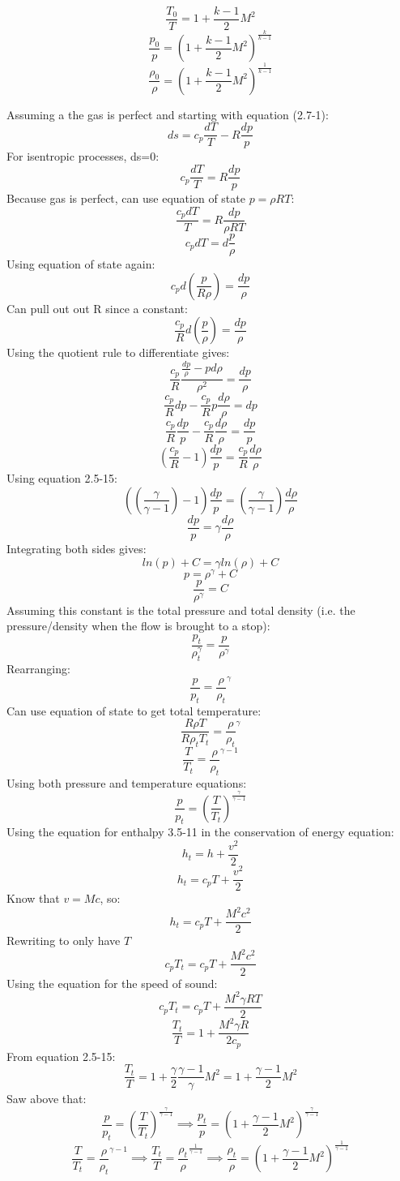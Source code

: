\documentclass[preview,12pt]{article}
\begin{document}
    $$\frac{T_0}{T}=1+\frac{k-1}{2}M^2$$
    $$\frac{p_0}{p}=\left(1+\frac{k-1}{2}M^2\right)^\frac{k}{k-1}$$
    $$\frac{\rho_0}{\rho}=\left(1+\frac{k-1}{2}M^2\right)^\frac{1}{k-1}$$
    
    Assuming a the gas is perfect and starting with equation (2.7-1):
    $$ds=c_p\frac{dT}{T}-R\frac{dp}{p}$$
    For isentropic processes, ds=0:
    $$c_p\frac{dT}{T}=R\frac{dp}{p}$$
    Because gas is perfect, can use equation of state $p=\rho R T$:
    $$\frac{c_pdT}{T}=R\frac{dp}{\rho R T}$$
    $$c_p dT=d\frac{p}{\rho}$$
    Using equation of state again:
    $$c_pd(\frac{p}{R\rho})=\frac{dp}{\rho}$$
    Can pull out out R since a constant:
    $$\frac{c_p}{R}d(\frac{p}{\rho})=\frac{dp}{\rho}$$
    Using the quotient rule to differentiate gives:
    $$\frac{c_p}{R}\frac{\frac{dp}{\rho}-pd\rho}{\rho^2}=\frac{dp}{\rho}$$
    $$\frac{c_p}{R}dp-\frac{c_p}{R}p\frac{d\rho}{\rho}=dp$$
    $$\frac{c_p}{R}\frac{dp}{p}-\frac{c_p}{R}\frac{d\rho}{\rho}=\frac{dp}{p}$$
    $$(\frac{c_p}{R}-1)\frac{dp}{p}=\frac{c_p}{R}\frac{d\rho}{\rho}$$
    Using equation 2.5-15:
    $$((\frac{\gamma}{\gamma-1})-1)\frac{dp}{p}=(\frac{\gamma}{\gamma-1})\frac{d\rho}{\rho}$$
    $$\frac{dp}{p}=\gamma\frac{d\rho}{\rho}$$
    Integrating both sides gives:
    $$ln(p)+C=\gamma ln(\rho)+C$$
    $$p=\rho^\gamma+C$$
    $$\frac{p}{\rho^\gamma}=C$$
    Assuming this constant is the total pressure and total density (i.e. the pressure/density when the flow is brought to a stop):
    $$\frac{p_t}{\rho_t^\gamma}=\frac{p}{\rho^\gamma}$$
    Rearranging:
    $$\frac{p}{p_t}=\frac{\rho}{\rho_t}^\gamma$$
    Can use equation of state to get total temperature:
    $$\frac{R\rho T}{R\rho_tT_t}=\frac{\rho}{\rho_t}^\gamma$$
    $$\frac{T}{T_t}=\frac{\rho}{\rho_t}^{\gamma-1}$$
    Using both pressure and temperature equations:
    $$\frac{p}{p_t}=\left(\frac{T}{T_t}\right)^{\frac{\gamma}{\gamma-1}}$$
    Using the equation for enthalpy 3.5-11 in the conservation of energy equation:
    $$h_t=h+\frac{v^2}{2}$$
    $$h_t=c_pT+\frac{v^2}{2}$$
    Know that $v=Mc$, so:
    $$h_t=c_pT+\frac{M^2c^2}{2}$$
    Rewriting to only have $T$
    $$c_pT_t=c_pT+\frac{M^2c^2}{2}$$
    Using the equation for the speed of sound:
    $$c_pT_t=c_pT+\frac{M^2\gamma RT}{2}$$
    $$\frac{T_t}{T}=1+\frac{M^2\gamma R}{2c_p}$$
    From equation 2.5-15:
    $$\frac{T_t}{T}=1+\frac{\gamma}{2}\frac{\gamma-1}{\gamma}M^2=\boxed{1+\frac{\gamma-1}{2}M^2}$$
    Saw above that:
    $$\frac{p}{p_t}=\left(\frac{T}{T_t}\right)^{\frac{\gamma}{\gamma-1}}\implies\frac{p_t}{p}=\boxed{\left(1+\frac{\gamma-1}{2}M^2\right)^\frac{\gamma}{\gamma-1}}$$
    $$\frac{T}{T_t}=\frac{\rho}{\rho_t}^{\gamma-1}\implies \frac{T_t}{T}=\frac{\rho_t}{\rho}^\frac{1}{\gamma-1}\implies\frac{\rho_t}{\rho}=\boxed{\left(1+\frac{\gamma-1}{2}M^2\right)^\frac{1}{\gamma-1}}$$
    
    
\end{document}
